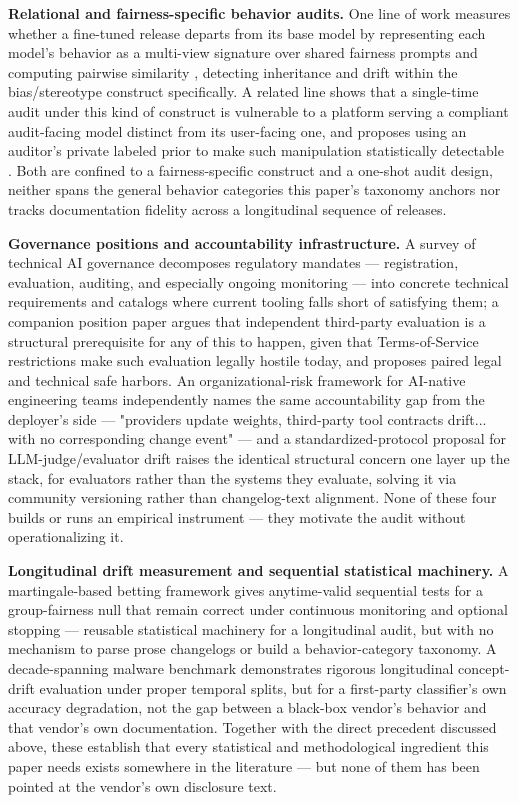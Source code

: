 \documentclass[11pt]{article}
\begin{document}
\textbf{Relational and fairness-specific behavior audits.} One line of work measures whether a fine-tuned release departs from its base model by representing each model's behavior as a multi-view signature over shared fairness prompts and computing pairwise similarity \citep{BiasSimilarity}, detecting inheritance and drift within the bias/stereotype construct specifically. A related line shows that a single-time audit under this kind of construct is vulnerable to a platform serving a compliant audit-facing model distinct from its user-facing one, and proposes using an auditor's private labeled prior to make such manipulation statistically detectable \citep{RobustAudit}. Both are confined to a fairness-specific construct and a one-shot audit design, neither spans the general behavior categories this paper's taxonomy anchors nor tracks documentation fidelity across a longitudinal sequence of releases.

\textbf{Governance positions and accountability infrastructure.} A survey of technical AI governance \citep{TAIG} decomposes regulatory mandates --- registration, evaluation, auditing, and especially ongoing monitoring --- into concrete technical requirements and catalogs where current tooling falls short of satisfying them; a companion position paper \citep{SafeHarbor} argues that independent third-party evaluation is a structural prerequisite for any of this to happen, given that Terms-of-Service restrictions make such evaluation legally hostile today, and proposes paired legal and technical safe harbors. An organizational-risk framework for AI-native engineering teams \citep{RiskArchitecture2607} independently names the same accountability gap from the deployer's side --- "providers update weights, third-party tool contracts drift... with no corresponding change event" --- and a standardized-protocol proposal for LLM-judge/evaluator drift \citep{EPC2607} raises the identical structural concern one layer up the stack, for evaluators rather than the systems they evaluate, solving it via community versioning rather than changelog-text alignment. None of these four builds or runs an empirical instrument --- they motivate the audit without operationalizing it.

\textbf{Longitudinal drift measurement and sequential statistical machinery.} A martingale-based betting framework \citep{FairBetting} gives anytime-valid sequential tests for a group-fairness null that remain correct under continuous monitoring and optional stopping --- reusable statistical machinery for a longitudinal audit, but with no mechanism to parse prose changelogs or build a behavior-category taxonomy. A decade-spanning malware benchmark \citep{LAMDA} demonstrates rigorous longitudinal concept-drift evaluation under proper temporal splits, but for a first-party classifier's own accuracy degradation, not the gap between a black-box vendor's behavior and that vendor's own documentation. Together with the direct precedent discussed above, these establish that every statistical and methodological ingredient this paper needs exists somewhere in the literature --- but none of them has been pointed at the vendor's own disclosure text.
\end{document}
